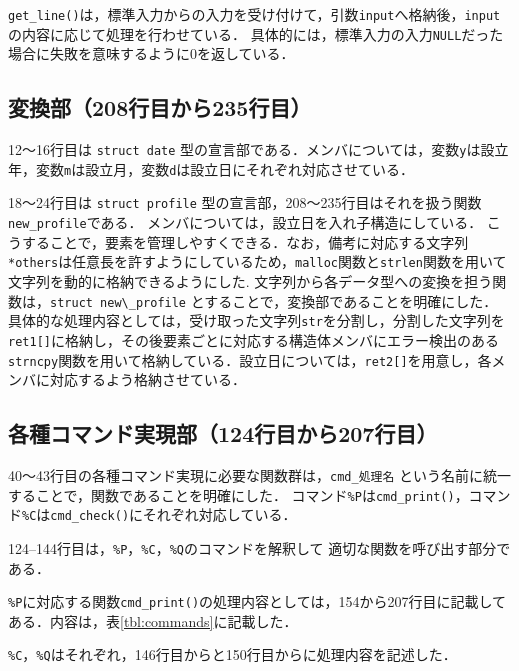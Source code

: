 \documentclass[a4j,11pt]{jarticle}
\begin{document}
\verb|get_line()|は，標準入力からの入力を受け付けて，引数\verb|input|へ格納後，\verb|input|の内容に応じて処理を行わせている．
具体的には，標準入力の入力\verb|NULL|だった場合に失敗を意味するように$0$を返している．
\subsection{変換部（208行目から235行目）}

12〜16行目は \verb|struct date| 型の宣言部である．メンバについては，変数\verb|y|は設立年，変数\verb|m|は設立月，変数\verb|d|は設立日にそれぞれ対応させている．

18〜24行目は \verb|struct profile| 型の宣言部，208〜235行目はそれを扱う関数\verb|new_profile|である．
メンバについては，設立日を入れ子構造にしている．
こうすることで，要素を管理しやすくできる．なお，備考に対応する文字列\verb|*others|は任意長を許すようにしているため，\verb|malloc|関数と\verb|strlen|関数を用いて文字列を動的に格納できるようにした. 
文字列から各データ型への変換を担う関数は，\verb|struct new\_profile| とすることで，変換部であることを明確にした．
具体的な処理内容としては，受け取った文字列\verb|str|を分割し，分割した文字列を\verb|ret1[]|に格納し，その後要素ごとに対応する構造体メンバにエラー検出のある\verb|strncpy|関数を用いて格納している．設立日については，\verb|ret2[]|を用意し，各メンバに対応するよう格納させている．

\subsection{各種コマンド実現部（124行目から207行目）}
40〜43行目の各種コマンド実現に必要な関数群は，\verb|cmd_処理名| という名前に統一することで，関数であることを明確にした．
コマンド\verb|%P|は\verb|cmd_print()|，コマンド\verb|%C|は\verb|cmd_check()|にそれぞれ対応している．

124--144行目は，\verb|%P|，\verb|%C|，\verb|%Q|のコマンドを解釈して
適切な関数を呼び出す部分である．

\verb|%P|に対応する関数\verb|cmd_print()|の処理内容としては，154から207行目に記載してある．内容は，表\ref{tbl:commands}に記載した．

\verb|%C|，\verb|%Q|はそれぞれ，146行目からと150行目からに処理内容を記述した．
\end{document}
